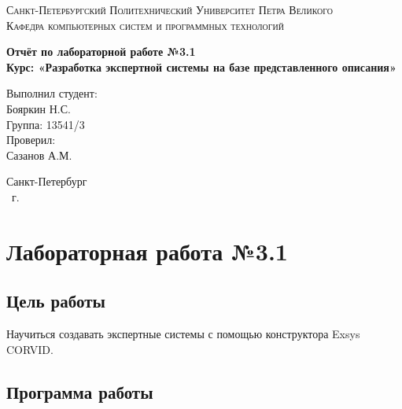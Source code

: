 \documentclass[14pt,a4paper,report]{report}
\begin{document}
\def\contentsname{Содержание}

\begin{titlepage}
	\begin{center}
		\textsc{Санкт-Петербургский Политехнический 
			Университет Петра Великого\\[5mm]
			Кафедра компьютерных систем и программных технологий}
		
		\vfill
		
		\textbf{Отчёт по лабораторной работе №3.1\\[3mm]
			Курс: «Разработка экспертной системы на базе представленного описания»\\[41mm]
		}
	\end{center}
	
	\hfill
	\begin{minipage}{.4\textwidth}
		Выполнил студент:\\[2mm] 
		Бояркин Н.С.\\
		Группа: 13541/3\\[5mm]
		
		Проверил:\\[2mm] 
		Сазанов А.М.
	\end{minipage}
	\vfill
	\begin{center}
		Санкт-Петербург\\ \the\year\ г.
	\end{center}
\end{titlepage}

\tableofcontents
\clearpage

\chapter{Лабораторная работа №3.1}

\section{Цель работы}

Научиться создавать экспертные системы с помощью конструктора Exsys CORVID.

\section{Программа работы}
\end{document}
